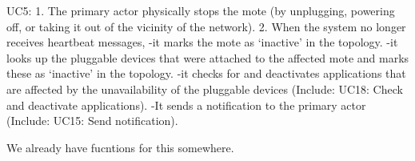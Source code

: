     UC5:
        1. The primary actor physically stops the mote (by unplugging, powering off, or taking it out of
            the vicinity of the network).
        2. When the system no longer receives heartbeat messages,
            -it marks the mote as `inactive' in the topology.
            -it looks up the pluggable devices that were attached to the affected mote and marks these
                as `inactive' in the topology.
            -it checks for and deactivates applications that are affected by the unavailability of the
                pluggable devices (Include: UC18: Check and deactivate applications).
            -It sends a notification to the primary actor (Include: UC15: Send notification).
        
        We already have fucntions for this somewhere.
        
